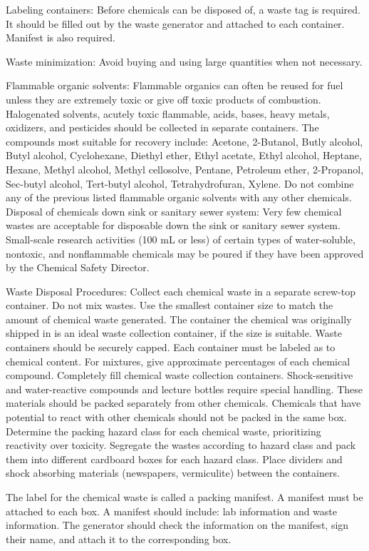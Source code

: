 \documentclass[12pt]{../SOP4_alpha}\usepackage[]{graphicx}\usepackage[]{color}
\begin{document}
\NP Labeling containers: Before chemicals can be disposed of, a waste tag is required. It should be filled out by the waste generator and attached to each container. Manifest is also required. 

\NP Waste minimization: Avoid buying and using large quantities when not necessary. 

\NP Flammable organic solvents: Flammable organics can often be reused for fuel unless they are extremely toxic or give off toxic products of combustion. Halogenated solvents, acutely toxic flammable, acids, bases, heavy metals, oxidizers, and pesticides should be collected in separate containers. The compounds most suitable for recovery include: Acetone, 2-Butanol, Butly alcohol, Butyl alcohol, Cyclohexane, Diethyl ether, Ethyl acetate, Ethyl alcohol, Heptane, Hexane, Methyl alcohol, Methyl cellosolve, Pentane, Petroleum ether, 2-Propanol, Sec-butyl alcohol, Tert-butyl alcohol, Tetrahydrofuran, Xylene. Do not combine any of the previous listed flammable organic solvents with any other chemicals. 
Disposal of chemicals down sink or sanitary sewer system:
Very few chemical wastes are acceptable for disposable down the sink or sanitary sewer system. Small-scale research activities (100 mL or less) of certain types of water-soluble, nontoxic, and nonflammable chemicals may be poured if they have been approved by the Chemical Safety Director. 

\NP Waste Disposal Procedures: Collect each chemical waste in a separate screw-top container. Do not mix wastes. Use the smallest container size to match the amount of chemical waste generated. The container the chemical was originally shipped in is an ideal waste collection container, if the size is suitable. Waste containers should be securely capped. Each container must be labeled as to chemical content. For mixtures, give approximate percentages of each chemical compound. Completely fill chemical waste collection containers. Shock-sensitive and water-reactive compounds and lecture bottles require special handling. These materials should be packed separately from other chemicals. Chemicals that have potential to react with other chemicals should not be packed in the same box. Determine the packing hazard class for each chemical waste, prioritizing reactivity over toxicity. Segregate the wastes according to hazard class and pack them into different cardboard boxes for each hazard class. Place dividers and shock absorbing materials (newspapers, vermiculite) between the containers. 

\NP The label for the chemical waste is called a packing manifest. A manifest must be attached to each box. A manifest should include: lab information and waste information. The generator should check the information on the manifest, sign their name, and attach it to the corresponding box. 
\end{document}
